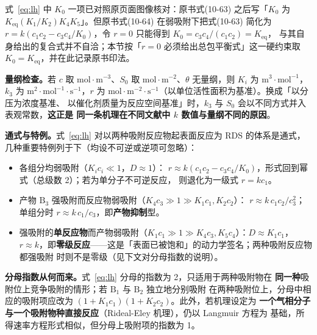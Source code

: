 式~\eqref{eq:lh} 中 $K_0$ 一项已对照原页面图像核对：原书式(10-63) 之后写「$K_0$ 为
$K_{\mathrm{eq}}(K_1/K_2)K_4K_5$」。但原书式(10-64) 在弱吸附下把式(10-63) 简化为
$r=k(c_1c_2-c_3c_4/K_0)$，令 $r=0$ 只能得到 $K_0=c_3c_4/(c_1c_2)=K_{\mathrm{eq}}$，
与其自身给出的复合式并不自洽；本节按「$r=0$ 必须给出总包平衡式」这一硬约束取
$K_0=K_{\mathrm{eq}}$，并在此记录原书印法。

\textbf{量纲检查。}若 $c$ 取 $\mathrm{mol{\cdot}m^{-3}}$、$S_0$ 取
$\mathrm{mol{\cdot}m^{-2}}$、$\theta$ 无量纲，则 $K_i$ 为 $\mathrm{m^3{\cdot}mol^{-1}}$，
$k_3$ 为 $\mathrm{m^{2}{\cdot}mol^{-1}{\cdot}s^{-1}}$，$r$ 为
$\mathrm{mol{\cdot}m^{-2}{\cdot}s^{-1}}$（以单位活性面积为基准）。换成「以分压为浓度基准、
以催化剂质量为反应空间基准」时，$k_3$ 与 $S_0$ 会以不同方式并入表观常数，\textbf{这正是
同一条机理在不同文献中 $k$ 数值与量纲不同的原因}。

\textbf{通式与特例。}式~\eqref{eq:lh} 对以两种吸附反应物起表面反应为 RDS 的体系是通式，
几种重要特例列于下（均设不可逆或逆项可忽略）：
\begin{itemize}
\item 各组分均弱吸附（$K_ic_i\ll1$，$D\approx1$）：
$r\approx k(c_1c_2-c_3c_4/K_0)$，形式回到幂式（总级数 2）；若为单分子不可逆反应，
则退化为一级式 $r=kc_1$。
\item 产物 $\mathrm{B_3}$ 强吸附而反应物弱吸附（$K_4c_3\gg1\gg K_1c_1,K_2c_2$）：
$r\approx k\,c_1c_2/c_3^2$；单组分时 $r\approx k\,c_1/c_3$，即\textbf{产物抑制}型。
\item 强吸附的\textbf{单反应物}而产物弱吸附（$K_1c_1\gg1\gg K_4c_3,K_5c_4$）：$D\approx K_1c_1$，
$r\approx k$，即\textbf{零级反应}——这是「表面已被饱和」的动力学签名；两种吸附反应物都强吸附
时则不是零级（见下文对分母指数的说明）。
\end{itemize}

\textbf{分母指数从何而来。}式~\eqref{eq:lh} 分母的指数为 2，只适用于两种吸附物在
\textbf{同一种}吸附位上竞争吸附的情形；若 $\mathrm{B_1}$ 与 $\mathrm{B_2}$ 独立地分别吸附
在两种吸附位上，分母中相应的吸附项应改为 $(1+K_1c_1)(1+K_2c_2)$。此外，若机理设定为
\textbf{一个气相分子与一个吸附物种直接反应}（Rideal-Eley 机理），仍以 Langmuir 方程为
基础，所得速率方程形式相似，但分母上吸附项的指数为 1。

